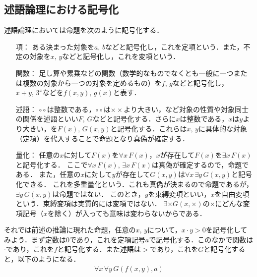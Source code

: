 \documentclass[10pt,b5paper,papersize,dvipdfmx]{jsbook}
\begin{document}
\subsection{述語論理における記号化}
述語論理においては命題を次のように記号化する． 
\begin{itemize}
  \item[項：]
  ある決まった対象を$a,\,b$などと記号化し，これを定項という．また，不定の対象を$x,\,y$などと記号化し，これを変項という． 
  \item[関数：]
  足し算や累乗などの関数（数学的なものでなくとも一般に一つまたは複数の対象から一つの対象を定めるもの）を$f,\,g$などと記号化し，$x+y,\,3^x$などを$f(x,y),\,g(x)$と表す．
  \item[述語：]
  $\circ\circ$は整数である，$\circ\circ$は$\times\times$より大きい，など対象の性質や対象同士の関係を述語といい$F,\,G$などと記号化する．さらに$x$は整数である，$x$は$y$より大きい，を$F(x),\,G(x,y)$と記号化する．これらは$x,\,y$に具体的な対象（定項）を代入することで命題となり真偽が確定する．
  \item[量化：]
  任意の$x$に対して$F(x)$を$\forall x\, F(x)$，$x$が存在して$F(x)$を$\exists x\, F(x)$と記号化する．
  ここで$\forall x\, F(x),\,\exists x\, F(x)$は真偽が確定するので，命題である．
  また，任意の$x$に対して$y$が存在して$G(x,y)$は$\forall x\, \exists y\, G(x,y)$と記号化できる．
  これを多重量化という．これも真偽が決まるので命題であるが，$\exists y\, G(x,y)$は命題ではない．
  このとき，$y$を束縛変項といい，$x$を自由変項という．束縛変項は実質的には変項ではない．
  $\exists \times G(x,\times)$の$\times$にどんな変項記号（$x$を除く）が入っても意味は変わらないからである．
\end{itemize}
それでは前述の推論に現れた命題，任意の$x,\,y$について，$x\cdot y>0$を記号化してみよう．まず定数は$0$であり，これを定項記号$a$で記号化する．このなかで関数は$\cdot$であり，これを$f$と記号化する．また述語は$>$であり，これを$G$と記号化すると，以下のようになる．
\begin{align*}
  \forall x\, \forall y\, G(f(x,y),a)
\end{align*}
\end{document}
